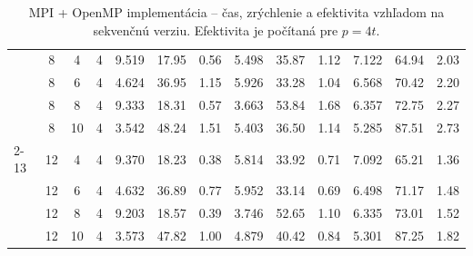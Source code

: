 {\begin{table}[H]
{\begin{tabular}{|l|c|c|c|ccc|ccc|ccc|}
 & 8 & 4  & 4 & 9.519 & 17.95 & 0.56 & 5.498 & 35.87 & 1.12 & 7.122 & 64.94 & 2.03 \\
 & 8 & 6  & 4 & 4.624 & 36.95 & 1.15 & 5.926 & 33.28 & 1.04 & 6.568 & 70.42 & 2.20 \\
 & 8 & 8  & 4 & 9.333 & 18.31 & 0.57 & 3.663 & 53.84 & 1.68 & 6.357 & 72.75 & 2.27 \\
 & 8 & 10 & 4 & 3.542 & 48.24 & 1.51 & 5.403 & 36.50 & 1.14 & 5.285 & 87.51 & 2.73 \\
\cline{2-13}

 & 12 & 4  & 4 & 9.370 & 18.23 & 0.38 & 5.814 & 33.92 & 0.71 & 7.092 & 65.21 & 1.36 \\
 & 12 & 6  & 4 & 4.632 & 36.89 & 0.77 & 5.952 & 33.14 & 0.69 & 6.498 & 71.17 & 1.48 \\
 & 12 & 8  & 4 & 9.203 & 18.57 & 0.39 & 3.746 & 52.65 & 1.10 & 6.335 & 73.01 & 1.52 \\
 & 12 & 10 & 4 & 3.573 & 47.82 & 1.00 & 4.879 & 40.42 & 0.84 & 5.301 & 87.25 & 1.82 \\
\hline

\end{tabular}
}
\caption{MPI + OpenMP implementácia – čas, zrýchlenie a efektivita vzhľadom na sekvenčnú verziu. Efektivita je počítaná pre $p=4t$.}
\end{table}
}